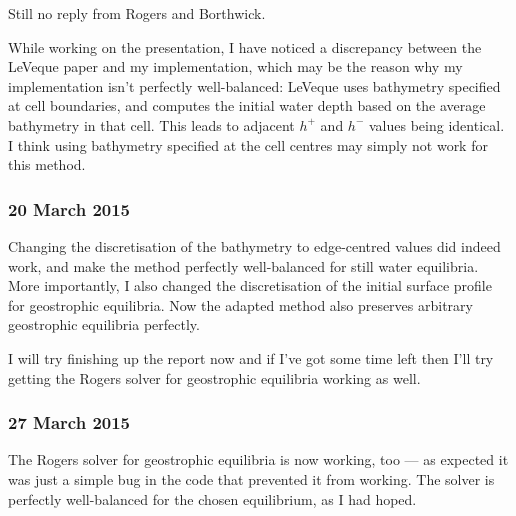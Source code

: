 \documentclass[a4paper,onecolumn,11pt]{report}
\begin{document}
Still no reply from Rogers and Borthwick.

While working on the presentation, I have noticed a discrepancy between the LeVeque paper and my implementation, which may be the reason why my implementation isn't perfectly well-balanced: LeVeque uses bathymetry specified at cell boundaries, and computes the initial water depth based on the average bathymetry in that cell. This leads to adjacent $h^+$ and $h^-$ values being identical. I think using bathymetry specified at the cell centres may simply not work for this method.

\subsubsection*{20 March 2015}

Changing the discretisation of the bathymetry to edge-centred values did indeed work, and make the method perfectly well-balanced for still water equilibria. More importantly, I also changed the discretisation of the initial surface profile for geostrophic equilibria. Now the adapted method also preserves arbitrary geostrophic equilibria perfectly.

I will try finishing up the report now and if I've got some time left then I'll try getting the Rogers solver for geostrophic equilibria working as well.

\subsubsection*{27 March 2015}

The Rogers solver for geostrophic equilibria is now working, too --- as expected it was just a simple bug in the code that prevented it from working. The solver is perfectly well-balanced for the chosen equilibrium, as I had hoped.



\end{document}
